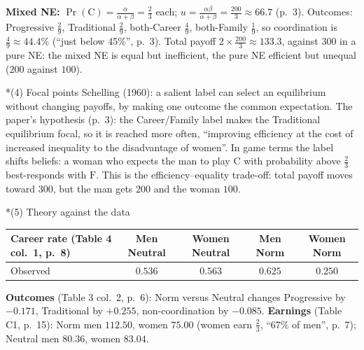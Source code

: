 \documentclass[10pt,a4paper]{article}
\makeatletter
\renewcommand\section{\@startsection{section}{1}{\z@}{6pt plus 2pt}{2pt}{\normalfont\large\bfseries}}
\newcommand{\C}{\mathrm{C}}
\newcommand{\Fm}{\mathrm{F}}
\makeatother
\begin{document}
\begin{tcolorbox}[colback=ans!5,colframe=ans,boxrule=0.6pt,left=5pt,right=5pt,top=3pt,bottom=3pt]
\textbf{Mixed NE:} $\Pr(\C)=\tfrac{\alpha}{\alpha+\beta}=\tfrac23$ each; $u=\tfrac{\alpha\beta}{\alpha+\beta}=\tfrac{200}{3}\approx66.7$
(p.~3). Outcomes: Progressive $\tfrac29$, Traditional $\tfrac29$, both-Career $\tfrac49$, both-Family
$\tfrac19$, so coordination is $\tfrac49\approx44.4\%$ (``just below 45\%'', p.~3). Total payoff
$2\times\tfrac{200}{3}\approx133.3$, against $300$ in a pure NE: the mixed NE is equal but
inefficient, the pure NE efficient but unequal ($200$ against $100$).
\end{tcolorbox}

\section*{(4) Focal points}
Schelling (1960): a salient label can select an equilibrium without changing payoffs, by making one
outcome the common expectation. The paper's hypothesis (p.~3): the Career/Family label makes the
Traditional equilibrium focal, so it is reached more often, ``improving efficiency at the cost of
increased inequality to the disadvantage of women''. In game terms the label shifts beliefs: a woman
who expects the man to play $\C$ with probability above $\tfrac23$ best-responds with $\Fm$. This is
the efficiency--equality trade-off: total payoff moves toward $300$, but the man gets $200$ and the
woman $100$.

\section*{(5) Theory against the data}
\begin{center}\small
\begin{tabular}{lcccc}
\toprule
Career rate (Table 4 col.~1, p.~8) & Men Neutral & Women Neutral & Men Norm & Women Norm \\
\midrule
Observed & $0.536$ & $0.563$ & $0.625$ & $0.250$ \\
\bottomrule
\end{tabular}
\end{center}
\textbf{Outcomes} (Table 3 col.~2, p.~6): Norm versus Neutral changes Progressive by $-0.171$,
Traditional by $+0.255$, non-coordination by $-0.085$. \textbf{Earnings} (Table C1, p.~15): Norm men
$112.50$, women $75.00$ (women earn $\tfrac23$, ``67\% of men'', p.~7); Neutral men $80.36$, women $83.04$.
\end{document}
